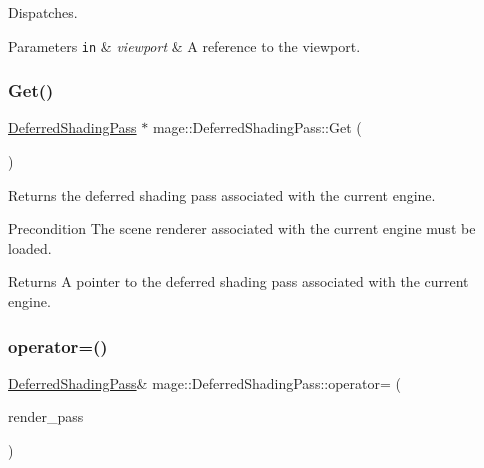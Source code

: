 Dispatches.


\begin{DoxyParams}[1]{Parameters}
\mbox{\tt in}  & {\em viewport} & A reference to the viewport. \\
\hline
\end{DoxyParams}
\hypertarget{classmage_1_1_deferred_shading_pass_a430dec186afda1f40c695b95fe3f7338}{}\label{classmage_1_1_deferred_shading_pass_a430dec186afda1f40c695b95fe3f7338} 
\subsubsection{\texorpdfstring{Get()}{Get()}}
{\footnotesize\ttfamily \hyperlink{classmage_1_1_deferred_shading_pass}{Deferred\+Shading\+Pass} $\ast$ mage\+::\+Deferred\+Shading\+Pass\+::\+Get (\begin{DoxyParamCaption}{ }\end{DoxyParamCaption})\hspace{0.3cm}{\ttfamily [static]}}

Returns the deferred shading pass associated with the current engine.

\begin{DoxyPrecond}{Precondition}
The scene renderer associated with the current engine must be loaded. 
\end{DoxyPrecond}
\begin{DoxyReturn}{Returns}
A pointer to the deferred shading pass associated with the current engine. 
\end{DoxyReturn}
\hypertarget{classmage_1_1_deferred_shading_pass_afcb5b0299030a2a60dcb3685ca875e3e}{}\label{classmage_1_1_deferred_shading_pass_afcb5b0299030a2a60dcb3685ca875e3e} 
\subsubsection{\texorpdfstring{operator=()}{operator=()}\hspace{0.1cm}{\footnotesize\ttfamily [1/2]}}
{\footnotesize\ttfamily \hyperlink{classmage_1_1_deferred_shading_pass}{Deferred\+Shading\+Pass}\& mage\+::\+Deferred\+Shading\+Pass\+::operator= (\begin{DoxyParamCaption}\item[{const \hyperlink{classmage_1_1_deferred_shading_pass}{Deferred\+Shading\+Pass} \&}]{render\+\_\+pass }\end{DoxyParamCaption})\hspace{0.3cm}{\ttfamily [delete]}}

